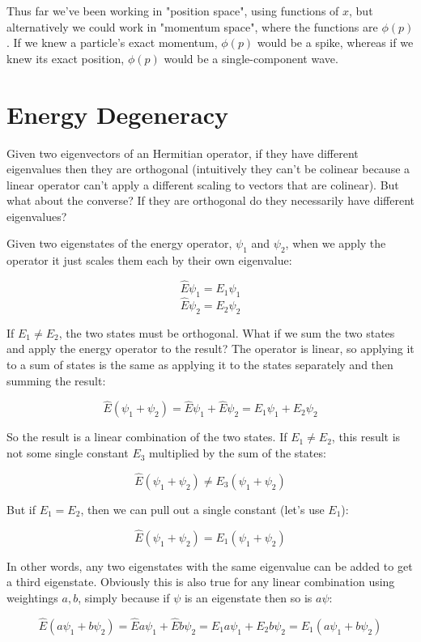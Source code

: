 Thus far we've been working in "position space", using functions of $x$, but alternatively we could work in "momentum space", where the functions are $\phi(p)$. If we knew a particle's exact momentum, $\phi(p)$ would be a spike, whereas if we knew its exact position, $\phi(p)$ would be a single-component wave.

\section{Energy Degeneracy}

Given two eigenvectors of an Hermitian operator, if they have different eigenvalues then they are orthogonal (intuitively they can't be colinear because a linear operator can't apply a different scaling to vectors that are colinear). But what about the converse? If they are orthogonal do they necessarily have different eigenvalues?

Given two eigenstates of the energy operator, $\psi_1$ and $\psi_2$, when we apply the operator it just scales them each by their own eigenvalue:

$$\hat{E}\psi_1 = E_1\psi_1$$
$$\hat{E}\psi_2 = E_2\psi_2$$

If $E_1 \ne E_2$, the two states must be orthogonal. What if we sum the two states and apply the energy operator to the result? The operator is linear, so applying it to a sum of states is the same as applying it to the states separately and then summing the result:

$$\hat{E}(\psi_1 + \psi_2) = \hat{E}\psi_1 + \hat{E}\psi_2 = E_1\psi_1 + E_2\psi_2$$

So the result is a linear combination of the two states. If $E_1 \ne E_2$, this result is not   some single constant $E_3$ multiplied by the sum of the states:

$$\hat{E}(\psi_1 + \psi_2) \ne E_3 (\psi_1 + \psi_2)$$

But if $E_1 = E_2$, then we can pull out a single constant (let's use $E_1$):

$$\hat{E}(\psi_1 + \psi_2) = E_1 (\psi_1 + \psi_2)$$

In other words, any two eigenstates with the same eigenvalue can be added to get a third eigenstate. Obviously this is also true for any linear combination using weightings $a, b$, simply because if $\psi$ is an eigenstate then so is $a\psi$:

$$\hat{E}(a\psi_1 + b\psi_2) = \hat{E}a\psi_1 + \hat{E}b\psi_2 = E_1a\psi_1 + E_2b\psi_2 = E_1(a\psi_1 + b\psi_2)$$

